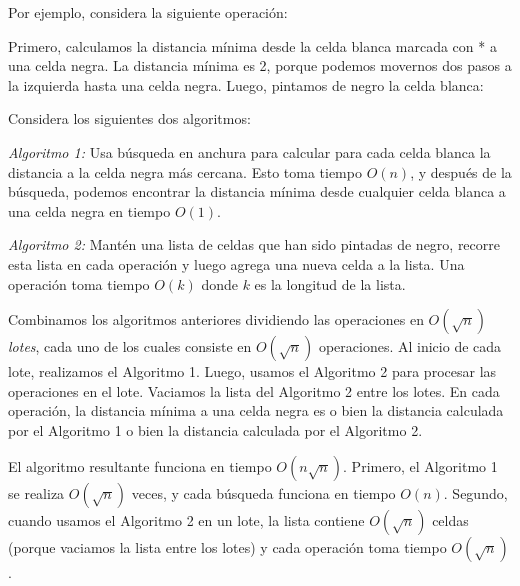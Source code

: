 Por ejemplo, considera la siguiente operación:

\begin{center}
\end{center}

Primero, calculamos la distancia mínima
desde la celda blanca marcada con * a una celda negra.
La distancia mínima es 2, porque podemos movernos
dos pasos a la izquierda hasta una celda negra.
Luego, pintamos de negro la celda blanca:

\begin{center}
\end{center}

Considera los siguientes dos algoritmos:

\emph{Algoritmo 1:} Usa búsqueda en anchura
para calcular
para cada celda blanca la distancia a la celda negra más cercana.
Esto toma tiempo $O(n)$, y después de la búsqueda,
podemos encontrar la distancia mínima desde cualquier celda blanca
a una celda negra en tiempo $O(1)$.

\emph{Algoritmo 2:} Mantén una lista de celdas que han sido
pintadas de negro, recorre esta lista en cada operación
y luego agrega una nueva celda a la lista.
Una operación toma tiempo $O(k)$ donde $k$ es la longitud de la lista.

Combinamos los algoritmos anteriores
dividiendo las operaciones en
$O(\sqrt n)$ \emph{lotes}, cada uno de los cuales consiste
en $O(\sqrt n)$ operaciones.
Al inicio de cada lote,
realizamos el Algoritmo 1.
Luego, usamos el Algoritmo 2 para procesar las operaciones
en el lote.
Vaciamos la lista del Algoritmo 2 entre
los lotes.
En cada operación,
la distancia mínima a una celda negra
es o bien la distancia calculada por el Algoritmo 1
o bien la distancia calculada por el Algoritmo 2.

El algoritmo resultante funciona en
tiempo $O(n \sqrt n)$.
Primero, el Algoritmo 1 se realiza $O(\sqrt n)$ veces,
y cada búsqueda funciona en tiempo $O(n)$.
Segundo, cuando usamos el Algoritmo 2 en un lote,
la lista contiene $O(\sqrt n)$ celdas
(porque vaciamos la lista entre los lotes)
y cada operación toma tiempo $O(\sqrt n)$.

